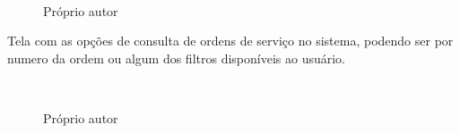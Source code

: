 \begin{figure}[H]
		\caption{\label{listagem_e_cadastro_de_usuario}Próprio autor}
	\centering
	\mbox{%
		\qquad
	}
	
\end{figure}
\newpage

Tela com as opções de consulta de ordens de serviço no sistema, podendo ser por numero da ordem ou algum dos filtros disponíveis ao usuário.

\begin{figure}[H]
		\caption{\label{Consulta_ordem}Próprio autor}
	\centering
	\mbox{%
		\qquad
	}
	
\end{figure}
\newpage
